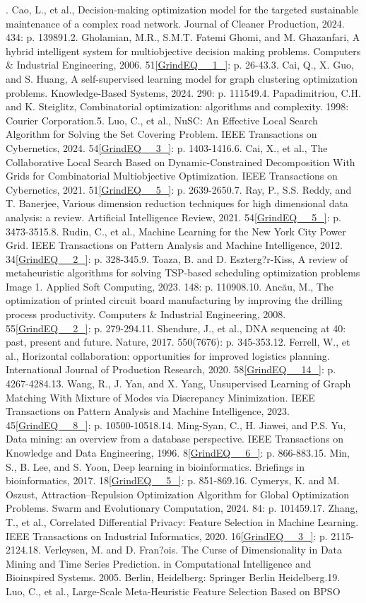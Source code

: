 \documentclass{article} %
\begin{document}
. Cao, L., et al., Decision-making optimization model for the targeted sustainable maintenance of a complex road network. Journal of Cleaner Production, 2024. 434: p. 139891.2. Gholamian, M.R., S.M.T. Fatemi Ghomi, and M. Ghazanfari, A hybrid intelligent system for multiobjective decision making problems. Computers \& Industrial Engineering, 2006. 51\eqref{GrindEQ__1_}: p. 26-43.3. Cai, Q., X. Guo, and S. Huang, A self-supervised learning model for graph clustering optimization problems. Knowledge-Based Systems, 2024. 290: p. 111549.4. Papadimitriou, C.H. and K. Steiglitz, Combinatorial optimization: algorithms and complexity. 1998: Courier Corporation.5. Luo, C., et al., NuSC: An Effective Local Search Algorithm for Solving the Set Covering Problem. IEEE Transactions on Cybernetics, 2024. 54\eqref{GrindEQ__3_}: p. 1403-1416.6. Cai, X., et al., The Collaborative Local Search Based on Dynamic-Constrained Decomposition With Grids for Combinatorial Multiobjective Optimization. IEEE Transactions on Cybernetics, 2021. 51\eqref{GrindEQ__5_}: p. 2639-2650.7. Ray, P., S.S. Reddy, and T. Banerjee, Various dimension reduction techniques for high dimensional data analysis: a review. Artificial Intelligence Review, 2021. 54\eqref{GrindEQ__5_}: p. 3473-3515.8. Rudin, C., et al., Machine Learning for the New York City Power Grid. IEEE Transactions on Pattern Analysis and Machine Intelligence, 2012. 34\eqref{GrindEQ__2_}: p. 328-345.9. Toaza, B. and D. Eszterg?r-Kiss, A review of metaheuristic algorithms for solving TSP-based scheduling optimization problems Image 1. Applied Soft Computing, 2023. 148: p. 110908.10. Anc\u{a}u, M., The optimization of printed circuit board manufacturing by improving the drilling process productivity. Computers \& Industrial Engineering, 2008. 55\eqref{GrindEQ__2_}: p. 279-294.11. Shendure, J., et al., DNA sequencing at 40: past, present and future. Nature, 2017. 550(7676): p. 345-353.12. Ferrell, W., et al., Horizontal collaboration: opportunities for improved logistics planning. International Journal of Production Research, 2020. 58\eqref{GrindEQ__14_}: p. 4267-4284.13. Wang, R., J. Yan, and X. Yang, Unsupervised Learning of Graph Matching With Mixture of Modes via Discrepancy Minimization. IEEE Transactions on Pattern Analysis and Machine Intelligence, 2023. 45\eqref{GrindEQ__8_}: p. 10500-10518.14. Ming-Syan, C., H. Jiawei, and P.S. Yu, Data mining: an overview from a database perspective. IEEE Transactions on Knowledge and Data Engineering, 1996. 8\eqref{GrindEQ__6_}: p. 866-883.15. Min, S., B. Lee, and S. Yoon, Deep learning in bioinformatics. Briefings in bioinformatics, 2017. 18\eqref{GrindEQ__5_}: p. 851-869.16. Cymerys, K. and M. Oszust, Attraction--Repulsion Optimization Algorithm for Global Optimization Problems. Swarm and Evolutionary Computation, 2024. 84: p. 101459.17. Zhang, T., et al., Correlated Differential Privacy: Feature Selection in Machine Learning. IEEE Transactions on Industrial Informatics, 2020. 16\eqref{GrindEQ__3_}: p. 2115-2124.18. Verleysen, M. and D. Fran?ois. The Curse of Dimensionality in Data Mining and Time Series Prediction. in Computational Intelligence and Bioinspired Systems. 2005. Berlin, Heidelberg: Springer Berlin Heidelberg.19. Luo, C., et al., Large-Scale Meta-Heuristic Feature Selection Based on BPSO 
\end{document}
